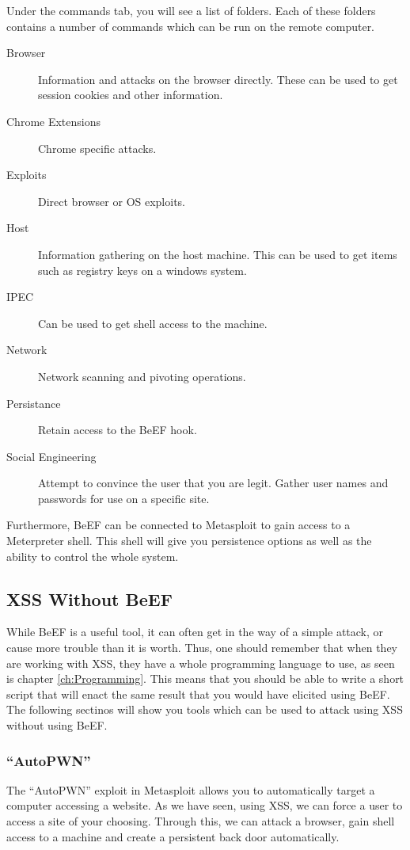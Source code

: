 				Under the commands tab, you will see a list of folders. 
				Each of these folders contains a number of commands which can be run on the remote computer. 
				\begin{description}
					\item[Browser] Information and attacks on the browser directly. 
						These can be used to get session cookies and other information. 
					\item[Chrome Extensions] Chrome specific attacks. 
					\item[Exploits] Direct browser or OS exploits. 
					\item[Host] Information gathering on the host machine. 
						This can be used to get items such as registry keys on a windows system. 
					\item[IPEC] Can be used to get shell access to the machine. 
					\item[Network] Network scanning and pivoting operations. 
					\item[Persistance] Retain access to the BeEF hook. 
					\item[Social Engineering] Attempt to convince the user that you are legit. 
						Gather user names and passwords for use on a specific site. 
				\end{description}

				Furthermore, BeEF can be connected to Metasploit to gain access to a Meterpreter shell. 
				This shell will give you persistence options as well as the ability to control the whole system. 
		\subsection{XSS Without BeEF}
			While BeEF is a useful tool, it can often get in the way of a simple attack, or cause more trouble than it is worth. 
			Thus, one should remember that when they are working with XSS, they have a whole programming language to use, as seen is chapter \ref{ch:Programming}.
			This means that you should be able to write a short script that will enact the same result that you would have elicited using BeEF. 
			The following sectinos will show you tools which can be used to attack using XSS without using BeEF. 

			\subsubsection{``AutoPWN''}
				The ``AutoPWN'' exploit in Metasploit allows you to automatically target a computer accessing a website. 
				As we have seen, using XSS, we can force a user to access a site of your choosing. 
				Through this, we can attack a browser, gain shell access to a machine and create a persistent back door automatically. 
	
